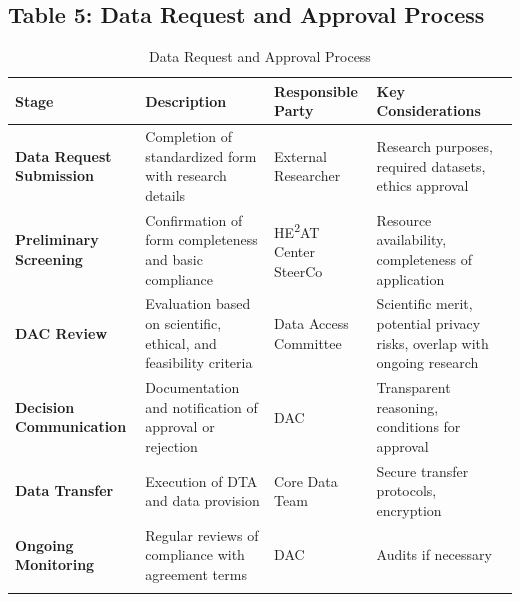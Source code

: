 \documentclass[12pt,a4paper,landscape]{article}
\begin{document}
\subsection*{Table 5: Data Request and Approval Process}
\begin{longtable}{L{3.5cm}L{6cm}L{4.5cm}L{5.5cm}}
\toprule
\textbf{Stage} & \textbf{Description} & \textbf{Responsible Party} & \textbf{Key Considerations} \\
\midrule
\endhead

\textbf{Data Request Submission} 
& Completion of standardized form with research details 
& External Researcher 
& Research purposes, required datasets, ethics approval \\
\midrule

\textbf{Preliminary Screening} 
& Confirmation of form completeness and basic compliance 
& HE\textsuperscript{2}AT Center SteerCo 
& Resource availability, completeness of application \\
\midrule

\textbf{DAC Review} 
& Evaluation based on scientific, ethical, and feasibility criteria 
& Data Access Committee 
& Scientific merit, potential privacy risks, overlap with ongoing research \\
\midrule

\textbf{Decision Communication} 
& Documentation and notification of approval or rejection 
& DAC 
& Transparent reasoning, conditions for approval \\
\midrule

\textbf{Data Transfer} 
& Execution of DTA and data provision 
& Core Data Team 
& Secure transfer protocols, encryption \\
\midrule

\textbf{Ongoing Monitoring} 
& Regular reviews of compliance with agreement terms 
& DAC 
& Audits if necessary \\
\bottomrule
\caption{Data Request and Approval Process}
\end{longtable}

\end{document}
